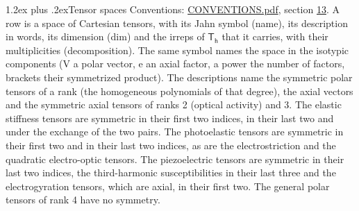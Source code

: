 \documentclass[10pt,a4paper]{article}
\makeatletter
\renewcommand\section{\@startsection{section}{1}{\z@}{-3ex plus -1ex minus -.2ex}%
  {1.2ex plus .2ex}{\normalfont\large\sffamily\bfseries\color{parttitle}}}
\numberwithin{equation}{section}
\newcommand{\grp}[1]{\mathsf{#1}}
\makeatother
\begin{document}
\section{Tensor spaces}\label{s:tensor_spaces}
Conventions: \href{../../CONVENTIONS.pdf}{CONVENTIONS.pdf}, section \href{../../CONVENTIONS.pdf\#conv.13}{13}.
\leavevmode\label{n:head.name}\label{n:head.description}\label{n:head.dim}\label{n:head.decomposition}A row is a space of Cartesian tensors, with its Jahn symbol (name), its description in words, its dimension (dim) and the irreps of $\grp{T_{h}}$ that it carries, with their multiplicities (decomposition). \label{n:label.jahn}The same symbol names the space in the isotypic components (V a polar vector, e an axial factor, a power the number of factors, brackets their symmetrized product). The descriptions name the symmetric polar tensors of a rank (the homogeneous polynomials of that degree), the axial vectors and the symmetric axial tensors of ranks 2 (optical activity) and 3. The elastic stiffness tensors are symmetric in their first two indices, in their last two and under the exchange of the two pairs. The photoelastic tensors are symmetric in their first two and in their last two indices, as are the electrostriction and the quadratic electro-optic tensors. The piezoelectric tensors are symmetric in their last two indices, the third-harmonic susceptibilities in their last three and the electrogyration tensors, which are axial, in their first two. The general polar tensors of rank 4 have no symmetry.
\end{document}
